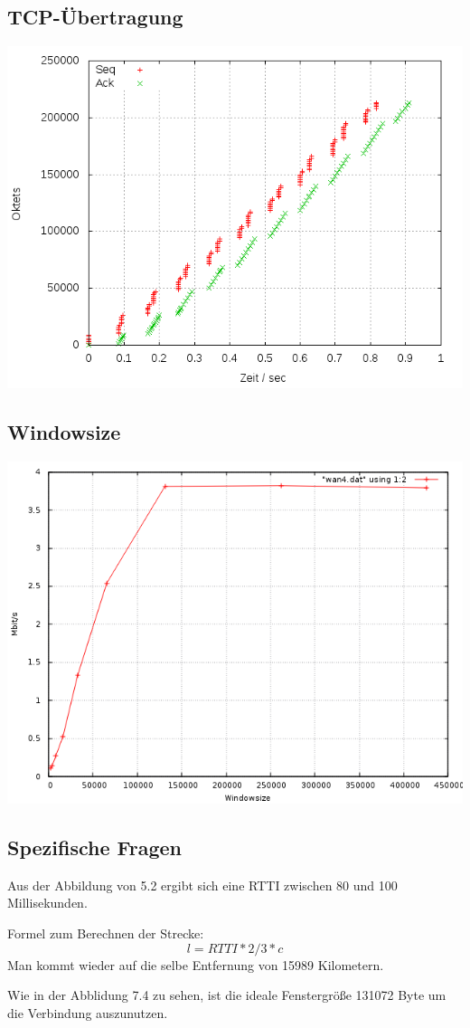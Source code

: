 \documentclass[a4paper,10pt]{article}
\begin{document}
\subsection{TCP-Übertragung}
\includegraphics[scale=0.75]{setup_wan4.png}

\subsection{Windowsize}
\includegraphics[scale=0.75]{wan4_windows.png}

\subsection{Spezifische Fragen}
\begin{itemize} 
 \item Aus der Abbildung von 5.2 ergibt sich eine RTTI zwischen 80 und 100 Millisekunden.
 \item {Formel zum Berechnen der Strecke: 
 \begin{equation}
  l=RTTI*2/3*c
 \end{equation}
 Man kommt wieder auf die selbe Entfernung von 15989 Kilometern.
 \item Wie in der Abblidung 7.4 zu sehen, ist die ideale Fenstergröße 131072 Byte um die Verbindung auszunutzen.}
\end{itemize}
 
\end{document}
